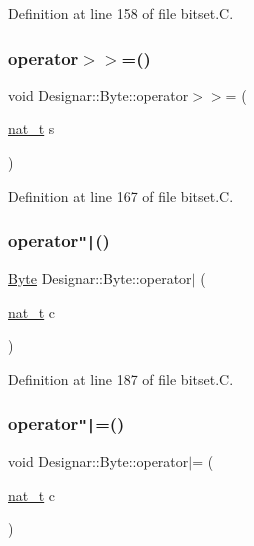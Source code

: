 Definition at line 158 of file bitset.\+C.

\mbox{\label{class_designar_1_1_byte_a542b9081222051f2d69a29e042602120}} 
\subsubsection{\texorpdfstring{operator$>$$>$=()}{operator>>=()}}
{\footnotesize\ttfamily void Designar\+::\+Byte\+::operator$>$$>$= (\begin{DoxyParamCaption}\item[{\hyperlink{namespace_designar_aa72662848b9f4815e7bf31a7cf3e33d1}{nat\+\_\+t}}]{s }\end{DoxyParamCaption})}



Definition at line 167 of file bitset.\+C.

\mbox{\label{class_designar_1_1_byte_a968c82b7108fccc2fb035f8b636d4563}} 
\subsubsection{\texorpdfstring{operator\texttt{"|}()}{operator|()}}
{\footnotesize\ttfamily \hyperlink{class_designar_1_1_byte}{Byte} Designar\+::\+Byte\+::operator$\vert$ (\begin{DoxyParamCaption}\item[{\hyperlink{namespace_designar_aa72662848b9f4815e7bf31a7cf3e33d1}{nat\+\_\+t}}]{c }\end{DoxyParamCaption})}



Definition at line 187 of file bitset.\+C.

\mbox{\label{class_designar_1_1_byte_ae2aed407fc88cfb41c2412cf5852dd30}} 
\subsubsection{\texorpdfstring{operator\texttt{"|}=()}{operator|=()}}
{\footnotesize\ttfamily void Designar\+::\+Byte\+::operator$\vert$= (\begin{DoxyParamCaption}\item[{\hyperlink{namespace_designar_aa72662848b9f4815e7bf31a7cf3e33d1}{nat\+\_\+t}}]{c }\end{DoxyParamCaption})}



